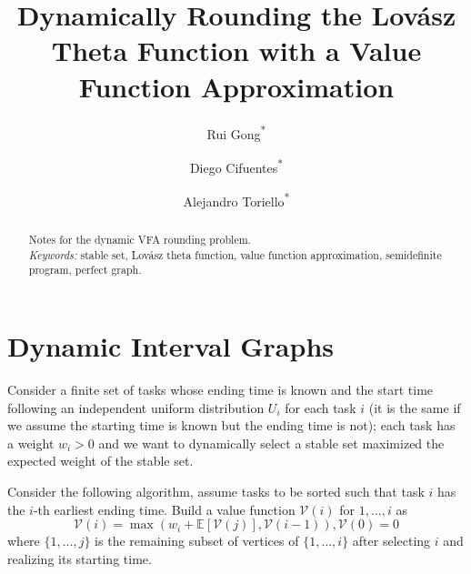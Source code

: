 \documentclass[10pt,leqno]{amsart}
\newcommand{\E}{\mathbb{E}}
\newcommand{\calV}{\mathcal{V}}
\begin{document}
\title{Dynamically Rounding the Lov\'asz Theta Function with a Value Function Approximation} %
\author[R. Gong]{Rui Gong\textsuperscript{*}}
\author[D. Cifuentes]{Diego Cifuentes\textsuperscript{*}}
\author[A. Toriello]{Alejandro Toriello\textsuperscript{*}}

\let\thefootnote\relax
{} %

\begin{abstract}
  Notes for the dynamic VFA rounding problem.\\
  \smallskip
  \noindent \textit{Keywords:} stable set,
  Lov\'asz theta function,
  value function approximation,
  semidefinite program,
  perfect graph.
\end{abstract} %
\maketitle
\section{Dynamic Interval Graphs}
Consider a finite set of tasks whose ending time is known and the start time following an independent uniform distribution $U_i$ for each task $i$ (it is the same if we assume the starting time is known but the ending time is not); each task has a weight $w_i>0$ and we want to dynamically select a stable set maximized the expected weight of the stable set.

Consider the following algorithm, assume tasks to be sorted such that task $i$ has the $i$-th earliest ending time.
Build a value function $\calV(i)$ for ${1,\ldots,i}$ as 
\[\calV(i)=\max(w_i+\E[\calV(j)],\calV(i-1)), \calV(0)=0\]
where $\{1,\ldots,j\}$ is the remaining subset of vertices of $\{1,\ldots,i\}$ after selecting $i$ and realizing its starting time.
\end{document}
